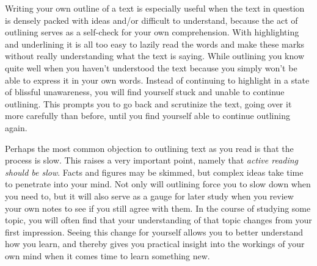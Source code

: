 Writing your own outline of a text is especially useful when the text in question is densely packed with ideas and/or difficult to understand, because the act of outlining serves as a self-check for your own comprehension.  With highlighting and underlining it is all too easy to lazily read the words and make these marks without really understanding what the text is saying.  While outlining you know quite well when you haven't understood the text because you simply won't be able to express it in your own words.  Instead of continuing to highlight in a state of blissful unawareness, you will find yourself stuck and unable to continue outlining.  This prompts you to go back and scrutinize the text, going over it more carefully than before, until you find yourself able to continue outlining again.  

Perhaps the most common objection to outlining text as you read is that the process is slow.  This raises a very important point, namely that \textit{active reading should be slow}.  Facts and figures may be skimmed, but complex ideas take time to penetrate into your mind.  Not only will outlining force you to slow down when you need to, but it will also serve as a gauge for later study when you review your own notes to see if you still agree with them.  In the course of studying some topic, you will often find that your understanding of that topic changes from your first impression.  Seeing this change for yourself allows you to better understand how you learn, and thereby gives you practical insight into the workings of your own mind when it comes time to learn something new.

























